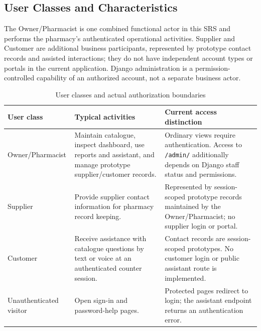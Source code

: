 \documentclass[11pt,a4paper]{article}
\begin{document}
\subsection{User Classes and Characteristics}
The Owner/Pharmacist is one combined functional actor in this SRS and performs the pharmacy's authenticated operational activities. Supplier and Customer are additional business participants, represented by prototype contact records and assisted interactions; they do not have independent account types or portals in the current application. Django administration is a permission-controlled capability of an authorized account, not a separate business actor.
\begin{table}[H]
\centering\small
\caption{User classes and actual authorization boundaries}
\begin{tabularx}{\textwidth}{L{30mm}YY}
\toprule User class & Typical activities & Current access distinction\\\midrule
Owner/Pharmacist & Maintain catalogue, inspect dashboard, use reports and assistant, and manage prototype supplier/customer records. & Ordinary views require authentication. Access to \texttt{/admin/} additionally depends on Django staff status and permissions.\\
Supplier & Provide supplier contact information for pharmacy record keeping. & Represented by session-scoped prototype records maintained by the Owner/Pharmacist; no supplier login or portal.\\
Customer & Receive assistance with catalogue questions by text or voice at an authenticated counter session. & Contact records are session-scoped prototypes. No customer login or public assistant route is implemented.\\
Unauthenticated visitor & Open sign-in and password-help pages. & Protected pages redirect to login; the assistant endpoint returns an authentication error.\\
\bottomrule
\end{tabularx}
\end{table}
\end{document}
